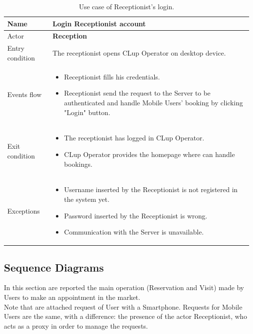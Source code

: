 \begin{table}[H]\begin{tabular}{|p{5cm} | p{7cm} | }
	\hline
	Name & \textbf{Login Receptionist account} \\
	\hline
	Actor & \textbf{Reception} \\
	\hline
	Entry condition &
	The receptionist opens CLup Operator on desktop device.  \\
	\hline
	Events flow & 
	\begin{itemize}
		\item Receptionist fills his credentials.
		\item Receptionist send the request to the Server to be authenticated and handle Mobile Users' booking by clicking "Login" button.
	\end{itemize} \\
	\hline
	Exit condition & \begin{itemize}
	\item The receptionist has logged in CLup Operator.
    \item CLup Operator provides the homepage where can handle bookings.
    \end{itemize}
    \\
	\hline 
	Exceptions & 
	\begin{itemize}
		\item Username inserted by the Receptionist is not registered in the system yet.
	    \item Password inserted by the Receptionist is wrong.
        \item Communication with the Server is unavailable.
	\end{itemize} \\
	\hline
\end{tabular}
\caption{Use case of Receptionist's login.}
\end{table}

\pagebreak

\subsection{Sequence Diagrams}
In this section are reported the main operation (Reservation and Visit) made by  Users to make an appointment in the market.\\
Note that are attached request of User with a Smartphone. Requests for Mobile Users are the same, with a difference: the presence of the actor Receptionist, who acts as a proxy in order to manage the requests.



